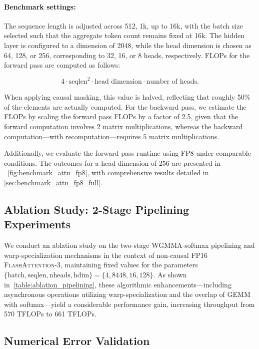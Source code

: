 \begin{itemize}
\paragraph{Benchmark settings:} The sequence length is adjusted across 512, 1k, up to 16k, with the batch size selected such that the aggregate token count remains fixed at 16k. The hidden layer is configured to a dimension of 2048, while the head dimension is chosen as 64, 128, or 256, corresponding to 32, 16, or 8 heads, respectively. FLOPs for the forward pass are computed as follows:

\begin{equation*}
  4 \cdot \text{seqlen}^2 \cdot \text{head dimension} \cdot \text{number of heads}.
\end{equation*}

When applying causal masking, this value is halved, reflecting that roughly 50\% of the elements are actually computed. For the backward pass, we estimate the FLOPs by scaling the forward pass FLOPs by a factor of 2.5, given that the forward computation involves 2 matrix multiplications, whereas the backward computation—with recomputation—requires 5 matrix multiplications.

Additionally, we evaluate the forward pass runtime using FP8 under comparable conditions. The outcomes for a head dimension of 256 are presented in ~\cref{fig:benchmark_attn_fp8}, with comprehensive results detailed in \cref{sec:benchmark_attn_fp8_full}.

\subsection{Ablation Study: 2-Stage Pipelining Experiments}
\label{sec:2-stage-pipelining-experiments}

We conduct an ablation study on the two-stage WGMMA-softmax pipelining and warp-specialization mechanisms in the context of non-causal FP16 \textsc{FlashAttention-3}, maintaining fixed values for the parameters $\{\text{batch}, \text{seqlen}, \text{nheads}, \text{hdim}\} = \{ 4, 8448, 16, 128\}$. As shown in~\cref{table:ablation_pipelining}, these algorithmic enhancements—including asynchronous operations utilizing warp-specialization and the overlap of GEMM with softmax—yield a considerable performance gain, increasing throughput from 570 TFLOPs to 661 TFLOPs.

\subsection{Numerical Error Validation}
\label{sec:numerical_error}


\end{itemize}
